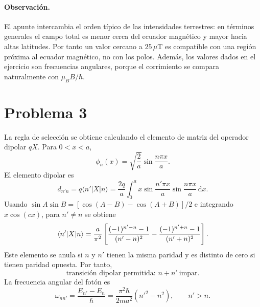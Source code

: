 \documentclass[11pt,a4paper]{article}
\numberwithin{equation}{section}
\renewcommand{\boxed}[1]{#1}
\newcommand{\hb}{\hbar}
\begin{document}
\paragraph{Observación.}
El apunte intercambia el orden típico de las intensidades terrestres: en términos generales el campo total es menor cerca del ecuador magnético y mayor hacia altas latitudes. Por tanto un valor cercano a $25\,\mu\mathrm T$ es compatible con una región próxima al ecuador magnético, no con los polos. Además, los valores dados en el ejercicio son frecuencias angulares, porque el corrimiento se compara naturalmente con $\mu_BB/\hb$.


\section{Problema 3}
La regla de selección se obtiene calculando el elemento de matriz del operador dipolar $qX$. Para $0<x<a$,
\begin{equation}
\phi_n(x)=\sqrt{\frac2a}\sin\frac{n\pi x}{a}.
\end{equation}
El elemento dipolar es
\begin{equation}
d_{n'n}=q\langle n'|X|n\rangle
=\frac{2q}{a}\int_0^a x\sin\frac{n'\pi x}{a}\sin\frac{n\pi x}{a}\,\mathrm dx.
\end{equation}
Usando $\sin A\sin B=[\cos(A-B)-\cos(A+B)]/2$ e integrando $x\cos(cx)$, para $n'\neq n$ se obtiene
\begin{equation}
\braket{n'|X|n}=\frac{a}{\pi^2}
\left[
\frac{(-1)^{n'-n}-1}{(n'-n)^2}
-\frac{(-1)^{n'+n}-1}{(n'+n)^2}
\right].
\end{equation}
Este elemento se anula si $n$ y $n'$ tienen la misma paridad y es distinto de cero si tienen paridad opuesta. Por tanto,
\begin{equation}
\boxed{\text{transición dipolar permitida: }n+n'\ \text{impar}.}
\end{equation}
La frecuencia angular del fotón es
\begin{equation}
\omega_{nn'}=\frac{E_{n'}-E_n}{\hb}
=\frac{\pi^2\hb}{2ma^2}(n'^2-n^2),\qquad n'>n.
\end{equation}
\end{document}
